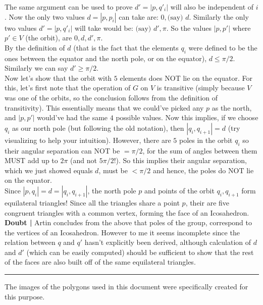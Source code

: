 \documentclass[12pt]{article}
\begin{document}
\begin{enumerate}[(a)]
The same argument can be used to prove $d' = |p,q'_{i}|$ will also be independent of $i$. Now the only two values $d=|p,p_{i}|$ can take are: $0, \text {(say) }d$. Similarly the only two values $d'=|p,q'_{i}|$ will take would be: $\text{(say) } d', \pi$. So the values $|p,p'|$ where $p' \in V$ (the orbit), are $0,d,d',\pi$.\\
By the definition of $d$ (that is the fact that the elements $q_{i}$ were defined to be the ones between the equator and the north pole, or on the equator), $d\leq \pi/2$. Similarly we can say $d'\geq \pi/2$.\\
Now let's show that the orbit with $5$ elements does NOT lie on the equator. For this, let's first note that the operation of $G$ on $V$ is transitive (simply because $V$ was one of the orbits, so the conclusion follows from the definition of transitivity). This essentially means that we could've picked any $p$ as the north, and $|p,p'|$ would've had the same $4$ possible values. Now this implies, if we choose $q_{i}$ as our north pole (but following the old notation), then $|q_{i},q_{i+1}| = d$ (try visualizing to help your intuition). However, there are $5$ poles in the orbit $q_{i}$ so their angular separation can NOT be $=\pi/2$, for the sum of angles between them MUST add up to $2\pi$ (and not $5\pi/2$!). So this implies their angular separation, which we just showed equals $d$, must be $<\pi/2$ and hence, the poles do NOT lie on the equator.\\
Since $|p,q_{i}|=d=|q_{i},q_{i+1}|$, the north pole $p$ and points of the orbit $q_{i},q_{i+1}$ form equilateral triangles! Since all the triangles share a point $p$, their are five congruent triangles with a common vertex, forming the face of an Icosahedron.\\
{\bf Doubt | } Artin concludes from the above that poles of the group, correspond to the vertices of an Icosahedron. However to me it seems incomplete since the relation between ${q}$ and ${q'}$ hasn't explicitly been derived, although calculation of $d$ and $d'$ (which can be easily computed) should be sufficient to show that the rest of the faces are also built off of the same equilateral triangles.
\end{enumerate}
\vspace{330pt}
\hrule
The images of the polygons used in this document were specifically created for this purpose.
\end{document}
